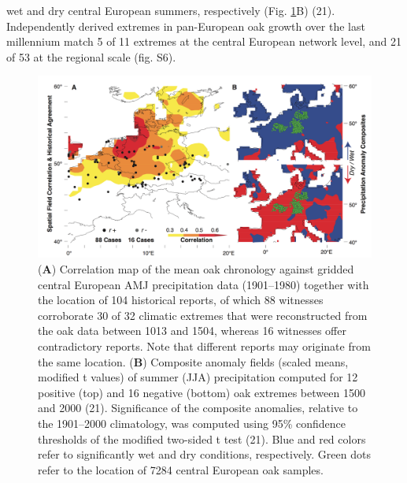 \documentclass[10pt,a4paper,twoside,onecolumn]{article}
\begin{document}
\begin{myfont}
\begin{multicols}{3}
wet and dry central European summers, respectively (Fig. \ref{Fig3}B) (21). Independently derived extremes in pan-European oak growth over the
last millennium match 5 of 11 extremes at the central European network level, and 21 of 53 at the regional scale (fig. S6). \par
	\end{multicols}	
\begin{figure}[h]
\includegraphics[width=1\textwidth]{BuntgenFig3}
	\begin{multicols}{2}
\caption{(\textbf{A}) Correlation map of the mean oak chronology against gridded central European AMJ precipitation data (1901–1980) together with the location of 104 historical reports, of which 88 witnesses corroborate 30 of 32 climatic extremes that were reconstructed from the oak data between 1013 and 1504, whereas 16 witnesses offer contradictory reports. Note that different reports may originate from the same location. (\textbf{B}) Composite anomaly fields (scaled means, modified t values) of summer (JJA) precipitation computed for 12 positive (top) and 16 negative (bottom) oak extremes between 1500 and 2000 (21). Significance of the composite anomalies, relative to the 1901–2000 climatology, was computed using 95\% confidence thresholds of the modified two-sided t test (21). Blue and red colors refer to significantly wet and dry conditions, respectively. Green dots refer to the location of 7284 central European oak samples.} 
	\end{multicols}	
\label{Fig3} 
\end{figure}


\end{myfont}
\end{document}
